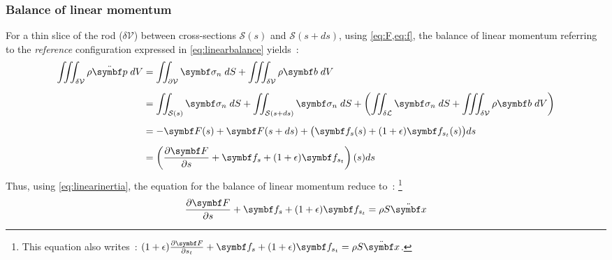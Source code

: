 \subsubsection{Balance of linear momentum}
For a thin slice of the rod ($\delta\mathcal{V}$) between cross-sections $\mathcal{S}(s)$ and $\mathcal{S}(s+ds)$, using \cref{eq:F,eq:f}, the balance of linear momentum referring to the \emph{reference} configuration expressed in \cref{eq:linearbalance} yields~:
\begin{equation}
	\begin{aligned}
		\iiint_{\delta\mathcal{V}} \rho \ddot{\vect{p}} \;dV
		&= \iint_{\partial\mathcal{V}} \vect{\sigma_n} \;dS
		+ \iiint_{\delta\mathcal{V}} \rho \vect{b} \;dV
		\\[0.5em]
		&= \iint_{\mathcal{S}(s)} \vect{\sigma_n} \;dS
		+ \iint_{\mathcal{S}(s+ds)} \vect{\sigma_n} \;dS
		+ \left( \iint_{\delta\mathcal{L}} \vect{\sigma_n} \;dS
		+ \iiint_{\delta\mathcal{V}} \rho \vect{b} \;dV \right)
		\\[0.5em]
		&= -\vect{F}(s) + \vect{F}(s+ds) + \big(\vect{f}_{s} (s) + (1+\epsilon) \vect{f}_{s_t}(s) \big) ds
		\\[0.5em]
		&= \left( \frac{\partial \vect{F}}{\partial s} + \vect{f}_{s}  + (1+\epsilon) \vect{f}_{s_t} \right)(s) ds
	\end{aligned}
\end{equation}
Thus, using \cref{eq:linearinertia}, the equation for the balance of linear momentum reduce to~: \footnote{This equation also writes~: $(1+\epsilon)\frac{\partial \vect{F}}{\partial s_t} + \vect{f}_{s}  + (1+\epsilon)\vect{f}_{s_t} = \rho S \ddot{\vect{x}}$.}
\begin{equation}
	\frac{\partial \vect{F}}{\partial s} + \vect{f}_{s}  + (1+\epsilon)\vect{f}_{s_t} = \rho S \ddot{\vect{x}}
	\label{eq:linearmotion}
\end{equation}


